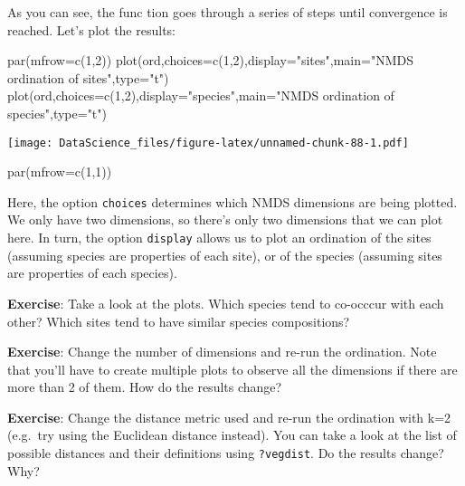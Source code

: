 \documentclass[
]{book}
\newenvironment{Shaded}{\begin{snugshade}}{\end{snugshade}}
\newcommand{\AttributeTok}[1]{\textcolor[rgb]{0.77,0.63,0.00}{#1}}
\newcommand{\DecValTok}[1]{\textcolor[rgb]{0.00,0.00,0.81}{#1}}
\newcommand{\FunctionTok}[1]{\textcolor[rgb]{0.00,0.00,0.00}{#1}}
\newcommand{\NormalTok}[1]{#1}
\newcommand{\StringTok}[1]{\textcolor[rgb]{0.31,0.60,0.02}{#1}}
\begin{document}
As you can see, the func tion goes through a series of steps until convergence is reached. Let's plot the results:

\begin{Shaded}
\begin{Highlighting}[]
\FunctionTok{par}\NormalTok{(}\AttributeTok{mfrow=}\FunctionTok{c}\NormalTok{(}\DecValTok{1}\NormalTok{,}\DecValTok{2}\NormalTok{))}
\FunctionTok{plot}\NormalTok{(ord,}\AttributeTok{choices=}\FunctionTok{c}\NormalTok{(}\DecValTok{1}\NormalTok{,}\DecValTok{2}\NormalTok{),}\AttributeTok{display=}\StringTok{"sites"}\NormalTok{,}\AttributeTok{main=}\StringTok{"NMDS ordination of sites"}\NormalTok{,}\AttributeTok{type=}\StringTok{"t"}\NormalTok{)}
\FunctionTok{plot}\NormalTok{(ord,}\AttributeTok{choices=}\FunctionTok{c}\NormalTok{(}\DecValTok{1}\NormalTok{,}\DecValTok{2}\NormalTok{),}\AttributeTok{display=}\StringTok{"species"}\NormalTok{,}\AttributeTok{main=}\StringTok{"NMDS ordination of species"}\NormalTok{,}\AttributeTok{type=}\StringTok{"t"}\NormalTok{)}
\end{Highlighting}
\end{Shaded}

\texttt{[image: DataScience\_files/figure-latex/unnamed-chunk-88-1.pdf]}

\begin{Shaded}
\begin{Highlighting}[]
\FunctionTok{par}\NormalTok{(}\AttributeTok{mfrow=}\FunctionTok{c}\NormalTok{(}\DecValTok{1}\NormalTok{,}\DecValTok{1}\NormalTok{))}
\end{Highlighting}
\end{Shaded}

Here, the option \texttt{choices} determines which NMDS dimensions are being plotted. We only have two dimensions, so there's only two dimensions that we can plot here. In turn, the option \texttt{display} allows us to plot an ordination of the sites (assuming species are properties of each site), or of the species (assuming sites are properties of each species).

\textbf{Exercise}: Take a look at the plots. Which species tend to co-occcur with each other? Which sites tend to have similar species compositions?

\textbf{Exercise}: Change the number of dimensions and re-run the ordination. Note that you'll have to create multiple plots to observe all the dimensions if there are more than 2 of them. How do the results change?

\textbf{Exercise}: Change the distance metric used and re-run the ordination with k=2 (e.g.~try using the Euclidean distance instead). You can take a look at the list of possible distances and their definitions using \texttt{?vegdist}. Do the results change? Why?
\end{document}
